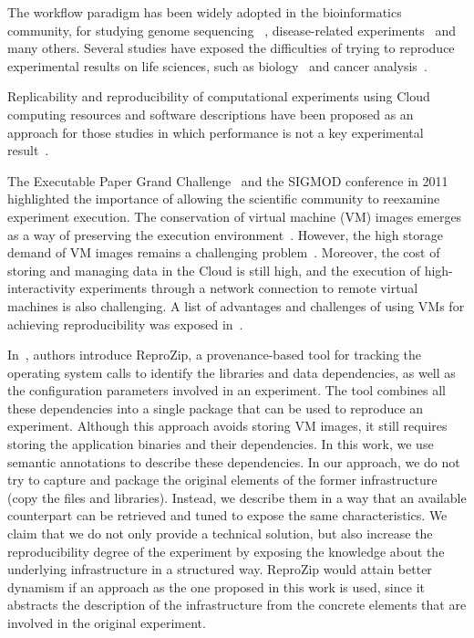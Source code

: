 The workflow paradigm has been widely adopted in the bioinformatics community, for studying genome sequencing ~\cite{blankenberg2010galaxy, giardine2005galaxy}, disease-related experiments~\cite{fisher2009systematic, gaizauskas2004} and many others. Several studies have exposed the difficulties of trying to reproduce experimental results on life sciences, such as biology~\cite{Ioannidis2009} and cancer analysis~\cite{ErringtonCancerRerpoducibility}.

Replicability and reproducibility of computational experiments using Cloud computing resources and software descriptions have been proposed as an approach for those studies in which performance is not a key experimental result~\cite{Crick14}.

The Executable Paper Grand Challenge~\cite{elsevierchallenge} and the SIGMOD conference in 2011~\cite{SIGMOD} highlighted the importance of allowing the scientific community to reexamine experiment execution. The conservation of virtual machine (VM) images emerges as a way of preserving the execution environment~\cite{Brammer,SHARE}. However, the high storage demand of VM images remains a challenging problem~\cite{Mao:2014:ROD:2600090.2512348,6552826}. Moreover, the cost of storing and managing data in the Cloud is still high, and the execution of high-interactivity experiments through a network connection to remote virtual machines is also challenging. A list of advantages and challenges of using VMs for achieving reproducibility was exposed in~\cite{Howe2012}.

In~\cite{reprozip}, authors introduce ReproZip, a provenance-based 
tool for tracking the operating system calls to identify the libraries and 
data dependencies, as well as the configuration parameters involved 
in an experiment. The tool combines all these dependencies into a 
single package that can be used to reproduce an experiment. 
Although this approach avoids storing VM images, it still requires 
storing the application binaries and their dependencies. In this work, we
use semantic annotations to describe these dependencies. In our 
approach, we do not try to capture and package the original elements of 
the former infrastructure (copy the files and libraries). Instead, we describe 
them in a way that an available counterpart can be retrieved and tuned to 
expose the same characteristics. We claim that we do not only provide a 
technical solution, but also increase the reproducibility degree of the 
experiment by exposing the knowledge about the underlying infrastructure 
in a structured way. ReproZip would attain better dynamism if an 
approach as the one proposed in this work is used, since it abstracts 
the description of the infrastructure from the concrete elements that 
are involved in the original experiment.


